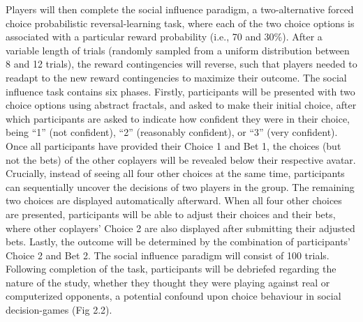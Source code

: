 \documentclass[12pt,a4paper,oneside,]{book} %
\begin{document}
Players will then complete the social influence paradigm, a two-alternative forced choice probabilistic reversal-learning task, where each of the two choice options is associated with a particular reward probability (i.e., 70 and 30\%). After a variable length of trials (randomly sampled from a uniform distribution between 8 and 12 trials), the reward contingencies will reverse, such that players needed to readapt to the new reward contingencies to maximize their outcome. The social influence task contains six phases. Firstly, participants will be presented with two choice options using abstract fractals, and asked to make their initial choice, after which participants are asked to indicate how confident they were in their choice, being ``1'' (not confident), ``2'' (reasonably confident), or ``3'' (very confident). Once all participants have provided their Choice 1 and Bet 1, the choices (but not the bets) of the other coplayers will be revealed below their respective avatar. Crucially, instead of seeing all four other choices at the same time, participants can sequentially uncover the decisions of two players in the group. The remaining two choices are displayed automatically afterward. When all four other choices are presented, participants will be able to adjust their choices and their bets, where other coplayers' Choice 2 are also displayed after submitting their adjusted bets. Lastly, the outcome will be determined by the combination of participants' Choice 2 and Bet 2. The social influence paradigm will consist of 100 trials. Following completion of the task, participants will be debriefed regarding the nature of the study, whether they thought they were playing against real or computerized opponents, a potential confound upon choice behaviour in social decision-games (Fig 2.2).
\end{document}

